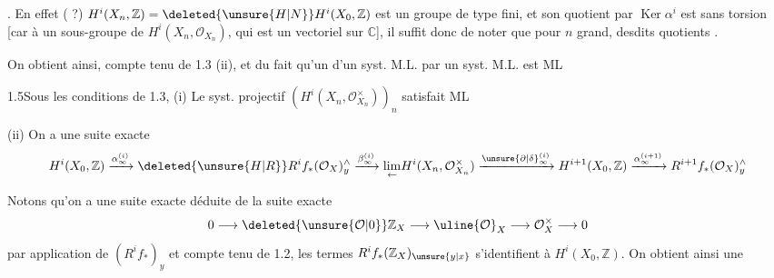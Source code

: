 . En effet ( ?) $H^i(X_n,\mathbb Z)=\deleted{\unsure{H|N}}H^i(X_0,\mathbb Z)$ est un groupe de type fini, et son quotient par $\operatorname{Ker}\alpha^i$ est sans torsion [car  à un sous-groupe de $H^i(X_n,\mathcal O_{X_n})$, qui est un vectoriel sur $\mathbb C$],  il suffit donc de noter que pour $n$ grand,   desdits quotients  .

On obtient ainsi, compte tenu de 1.3 (ii), et du fait qu'un  d'un syst. M.L. par un syst. M.L. est ML

\uline{} 1.5\quad Sous les conditions de 1.3,
(i) Le syst. projectif $(H^i(X_n,\mathcal O_{X_n}^{\times}))_n$ satisfait ML

(ii) On a une suite exacte
\[
H^i(X_0,\mathbb Z)\xrightarrow{\alpha_\infty^{(i)}}
\deleted{\unsure{H|R}}R^if_*(\mathcal O_X)_y^{\wedge}
\xrightarrow{\beta_\infty^{(i)}}\underset{\leftarrow}{\lim}H^i(X_n,\mathcal O_{X_n}^{\times})
\xrightarrow{\unsure{\partial|\delta}_\infty^{(i)}} H^{i+1}(X_0,\mathbb Z)
\xrightarrow{\alpha_\infty^{(i+1)}} R^{i+1}f_*(\mathcal O_X)_y^{\wedge}
\]

Notons qu'on a une suite exacte déduite de la suite exacte
\[
0\longrightarrow \deleted{\unsure{\mathcal O|0}}\mathbb Z_X\longrightarrow \uline{\mathcal O}_X\longrightarrow \mathcal O_X^{\times}\longrightarrow 0
\]
par application de $(R^if_*)_y$ et compte tenu de 1.2, les  termes $R^if_*(\mathbb Z_X)_{\unsure{y|x}}$  s'identifient à $H^i(X_0,\mathbb Z)$. On obtient ainsi une


